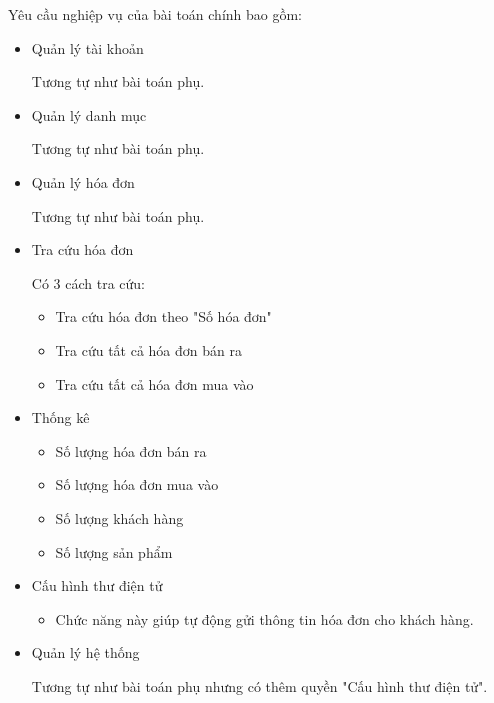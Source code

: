 Yêu cầu nghiệp vụ của bài toán chính bao gồm:

\begin{itemize}

\item Quản lý tài khoản

Tương tự như bài toán phụ.

\item Quản lý danh mục

Tương tự như bài toán phụ.

\item Quản lý hóa đơn

Tương tự như bài toán phụ.

\item Tra cứu hóa đơn

Có 3 cách tra cứu:

\begin{itemize}

\item Tra cứu hóa đơn theo "Số hóa đơn"

\item Tra cứu tất cả hóa đơn bán ra

\item Tra cứu tất cả hóa đơn mua vào

\end{itemize}

\item Thống kê

\begin{itemize}

\item Số lượng hóa đơn bán ra

\item Số lượng hóa đơn mua vào

\item Số lượng khách hàng

\item Số lượng sản phẩm

\end{itemize}

\item Cấu hình thư điện tử

\begin{itemize}

\item Chức năng này giúp tự động gửi thông tin hóa đơn cho khách hàng.

\end{itemize}

\item Quản lý hệ thống

Tương tự như bài toán phụ nhưng có thêm quyền "Cấu hình thư điện tử".

\end{itemize}